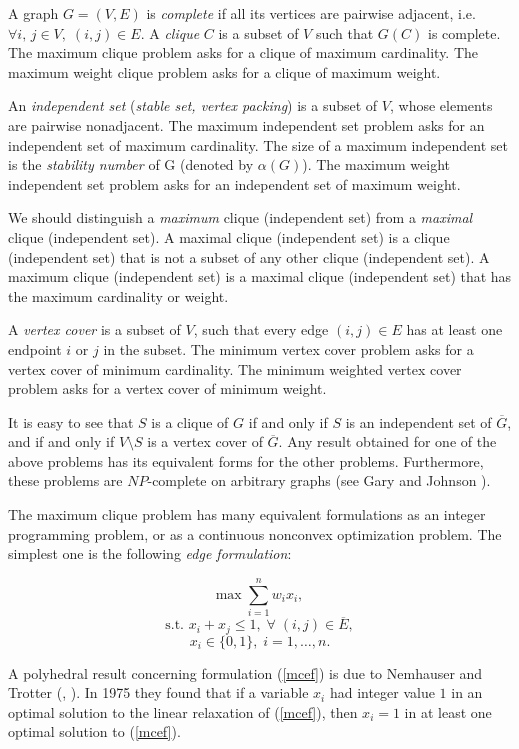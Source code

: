 A graph $G = (V,E)$ is {\em complete} if all its vertices are
pairwise adjacent, i.e. $\forall i, \, j \in V, \; (i,j) \in E$. A
{\em clique } $C$ is a subset of $V$ such that $G(C)$ is complete.
The maximum clique problem asks for a clique of maximum cardinality.
The maximum weight clique problem asks for a clique of maximum
weight.

An {\em independent set} ({\em stable set, vertex packing}) is a
subset of $V$, whose elements are pairwise nonadjacent. The maximum
independent set problem asks for an independent set of maximum
cardinality. The size of a maximum independent set is the
{\em stability number} of G (denoted by $\alpha(G)$). The maximum
weight independent set problem asks for an independent set of
maximum weight.

We should distinguish a {\em maximum} clique (independent set) from
a {\em maximal} clique (independent set). A maximal clique
(independent set) is a clique (independent set) that is not a subset
of any other clique (independent set). A maximum clique (independent
set) is a maximal clique (independent set) that has the maximum
cardinality or weight.

A {\em vertex cover} is a subset of $V$, such that every edge
$(i,j) \in E$ has at least one endpoint $i$ or $j$ in the subset.
The minimum vertex cover problem asks for a vertex cover of minimum
cardinality. The minimum weighted vertex cover problem asks for a
vertex cover of minimum weight. 


It is easy to see that $S$ is a clique of $G$ if and only if $S$ is
an independent set of $\overline{G}$, and if and only if
$V \setminus S$ is a vertex cover of $\overline{G}$. Any result
obtained for one of the above problems has its equivalent forms for
the other problems. Furthermore, these problems are $NP$-complete on
arbitrary graphs (see Gary and Johnson \cite{GaJo79}).

The maximum clique problem has many equivalent formulations as an
integer programming problem, or as a continuous nonconvex
optimization problem. The simplest one is the following
{\em edge formulation}:

\begin{equation}
\mbox{max} \; \sum_{i=1}^{n} w_{i} x_{i},
	\label{mcef}
\end{equation}
\[ \mbox{s.t. } x_i + x_j \leq 1, \;
	\forall \; (i,j) \in \overline{E}, \]
\[ x_{i} \in \{0,1\}, \; i = 1, \ldots, n. \]

A polyhedral result concerning formulation (\ref{mcef}) is due to
Nemhauser and Trotter (\cite{NeTr74}, \cite{NeTr75}). In 1975 they
found that if a variable $x_i$ had integer value $1$ in an optimal
solution to the linear relaxation of (\ref{mcef}), then $x_i = 1$
in at least one optimal solution to (\ref{mcef}).

